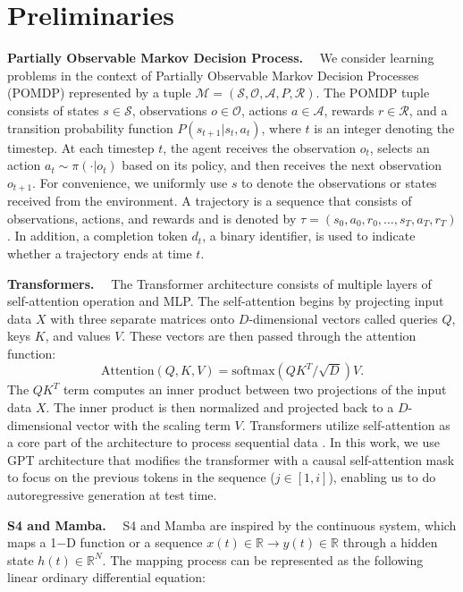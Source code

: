 \section{Preliminaries}

\noindent\textbf{Partially Observable Markov Decision Process.}~~
We consider learning problems in the context of Partially Observable Markov Decision Processes (POMDP) represented by a tuple $\mathcal{M}=(\mathcal{S,O,A},P, \mathcal{R})$. The POMDP tuple consists of states $s\in \mathcal{S} $, observations $o\in \mathcal{O} $, actions $a\in \mathcal{A} $, rewards $r\in \mathcal{R} $, and a transition probability function $P (s_{t+1}|s_t,a_t)$, where $t$ is an integer denoting the timestep. At each timestep $t$, the agent receives the observation $o_t$, selects an action $a_t \sim \pi(\cdot|o_t)$ based on its policy, and then receives the next observation $o_{t+1}$. For convenience, we uniformly use $s$ to denote the observations or states received from the environment.
A trajectory is a sequence that consists of observations, actions, and rewards and is denoted by $\tau=(s_0,a_0,r_0,\dots,s_T,a_T,r_T)$. 
In addition, a completion token $d_t$, a binary identifier, is used to indicate whether a trajectory ends at time $t$.


\noindent\textbf{Transformers.}~~
The Transformer \cite{4} architecture consists of multiple layers of self-attention operation and MLP. The self-attention begins by projecting input data $X$ with three separate matrices onto $D$-dimensional vectors called queries $Q$, keys $K$, and values $V$. These vectors are then passed through the attention function:
\begin{equation}
    \mathrm{Attention}(Q,K,V)=\mathrm{softmax}(QK^T/\sqrt{D})V.
\label{self-attention}
\end{equation}
The $QK^T$ term computes an inner product between two projections of the input data $X$. The inner product is then normalized and projected back to a $D$-dimensional vector with the scaling term $V$. Transformers utilize self-attention as a core part of the architecture to process sequential data \cite{21,22}. In this work, we use GPT \cite{23} architecture that modifies the transformer with a causal self-attention mask to focus on the previous tokens in the sequence ($j\in[1,i]$), enabling us to do autoregressive generation at test time.

\noindent\textbf{S4 and Mamba.}~~
S4 \cite{12} and Mamba \cite{10} are inspired by the continuous system, which maps a 1$-$D function or a sequence $x(t)\in \mathbb{R}\rightarrow y(t)\in \mathbb{R}$ through a hidden state $h(t)\in \mathbb{R}^N$. The mapping process can be represented as the following linear ordinary differential equation:

